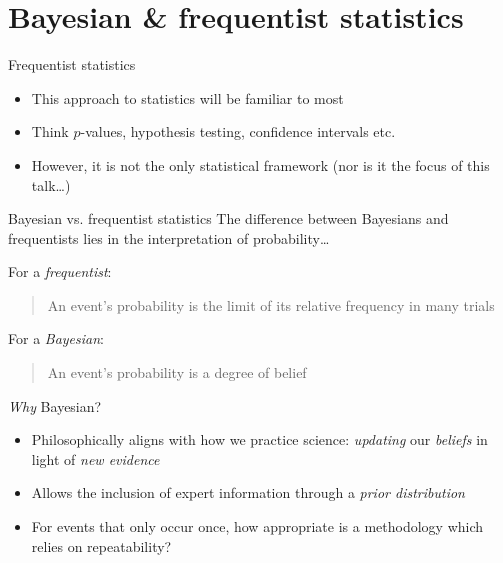 \documentclass[aspectratio=169]{beamer}
\begin{document}
\section{Bayesian \& frequentist statistics}

\begin{frame}{Frequentist statistics}
  \begin{itemize}
    \item This approach to statistics will be familiar to most
    \item Think $p$-values, hypothesis testing, confidence intervals etc.
    \item However, it is not the only statistical framework (nor is it the
          focus of this talk\ldots)
  \end{itemize}
\end{frame}

\begin{frame}{Bayesian vs. frequentist statistics}
  The difference between Bayesians and frequentists lies in the interpretation
  of probability\ldots

  For a \emph{frequentist}:\\\vspace{0.25cm}
  \begin{quote}
    {\normalfont An event's probability is the limit of its \alert{relative
        frequency in many trials}}
  \end{quote}

  For a \emph{Bayesian}:\\\vspace{0.25cm}
  \begin{quote}
    {\normalfont An event's probability is a \alert{degree of belief}}
  \end{quote}
\end{frame}

\begin{frame}{\emph{Why} Bayesian?}
  \begin{itemize}
    \item Philosophically aligns with how we practice science: \emph{updating}
          our \emph{beliefs} in light of \emph{new evidence}
    \item Allows the inclusion of expert information through a \emph{prior
            distribution}
    \item For events that only occur once, how appropriate is a methodology
          which relies on repeatability?
  \end{itemize}
\end{frame}
\end{document}
